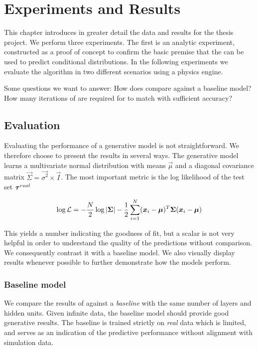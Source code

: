 \chapter{Experiments and Results}
\label{experiments}

This chapter introduces in greater detail the data and results for the thesis project. We perform three experiments. The first is an analytic experiment, constructed as a proof of concept to confirm the basic premise that the \cvae{} can be used to predict conditional distributions. In the following experiments we evaluate the \dettostoc{} algorithm in two different scenarios using a physics engine.

Some questions we want to answer: How does \dettostoc{} compare against a baseline model? How many iterations of \dettostoc{} are required for \fdecoder{} to match \fsimulator{} with sufficient accuracy?

\section{Evaluation}
Evaluating the performance of a generative model is not straightforward. We therefore choose to present the results in several ways. The generative model learns a multivariate normal distribution with means $\vec{\mu}$ and a diagonal covariance matrix $\vec{\Sigma} = \vec{\sigma^2}\times\vec{I}$. The most important metric is the log likelihood of the test set $\boldsymbol{\tau}^{real}$

\begin{equation}
    \log \mathcal{L} = -\frac{N}{2} \log \vert \boldsymbol{\Sigma} \vert - 
    \frac{1}{2} \sum^N_{i=1} (\boldsymbol{x}_i - \boldsymbol{\mu})^T \boldsymbol{\Sigma} (\boldsymbol{x}_i - \boldsymbol{\mu}) 
\end{equation}

This yields a number indicating the goodness of fit, but a scalar is not very helpful in order to understand the quality of the predictions without comparison. We consequently contrast it with a baseline model. We also visually display results whenever possible to further demonstrate how the models perform.

\subsection{Baseline model}
We compare the results of \dettostoc{} against a \emph{baseline} \cvae{} with the same number of layers and hidden units. Given infinite data, the baseline model should provide good generative results. The baseline \cvae{} is trained strictly on \emph{real} data which is limited, and serves as an indication of the predictive performance without alignment with simulation data.

